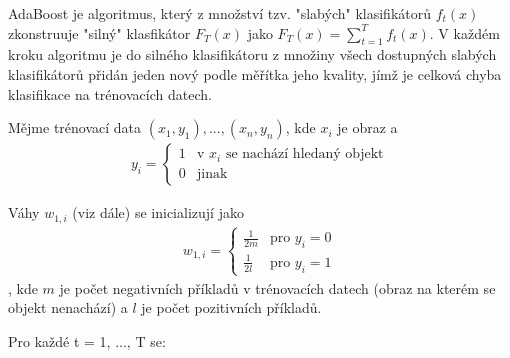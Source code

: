 	AdaBoost je algoritmus, který z množství tzv. "slabých" klasifikátorů $f_t(x)$ zkonstruuje "silný" klasfikátor $F_T(x)$ jako $F_T(x) = \sum_{t=1}^{T} f_t(x)$. V každém kroku algoritmu je do silného klasifikátoru z množiny všech dostupných slabých klasifikátorů přidán jeden nový podle měřítka jeho kvality, jímž je celková chyba klasifikace na trénovacích datech. 
	
	Mějme trénovací data $(x_1, y_1), ... ,(x_n, y_n)$, kde $x_i$ je obraz a 
	\begin{align}
	y_i = \begin{cases}
	1 & \text{v } x_i \text{ se nachází hledaný objekt} \\
	0 & \text{jinak}
	\end{cases}
	\end{align}  
	
	Váhy $w_{1,i}$ (viz dále)  se inicializují jako 
	\begin{align}
	w_{1,i} = \begin{cases}
	\frac{1}{2m} & \text{pro } y_i = 0\\
	\frac{1}{2l} & \text{pro } y_i = 1
	\end{cases}
	\end{align},
	kde $m$ je počet negativních příkladů v trénovacích datech (obraz na kterém se objekt nenachází) a $l$ je počet pozitivních příkladů.
	
	Pro každé t = 1, ..., T se:
	
